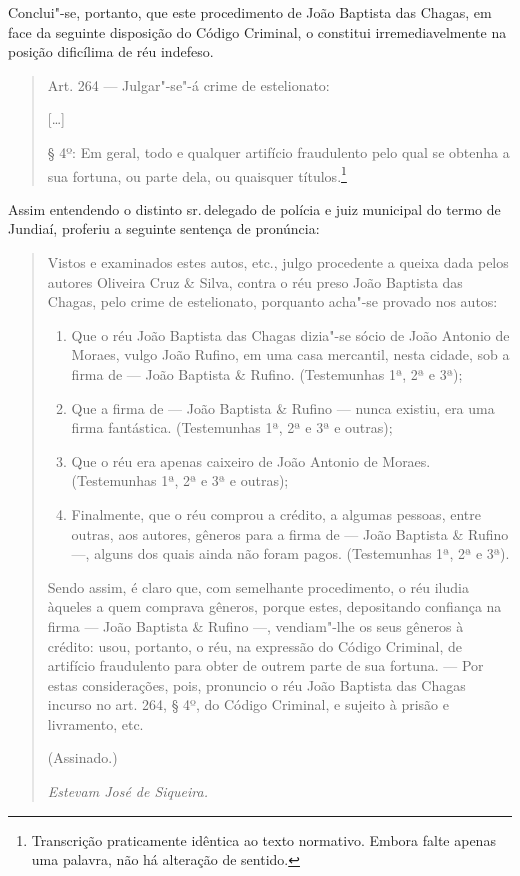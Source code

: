 Conclui"-se, portanto, que este procedimento de João Baptista das Chagas,
em face da seguinte disposição do Código Criminal, o constitui
irremediavelmente na posição dificílima de réu indefeso.

\begin{quote}
Art. 264 --- Julgar"-se"-á crime de estelionato:

{[}\ldots{}{]}

§ 4º: Em geral, todo e qualquer artifício fraudulento pelo qual se
obtenha a sua fortuna, ou parte dela, ou quaisquer títulos.\footnote{Transcrição
  praticamente idêntica ao texto normativo. Embora falte apenas uma
  palavra, não há alteração de sentido.}
\end{quote}

Assim entendendo o distinto sr.\,delegado de polícia e juiz municipal do
termo de Jundiaí, proferiu a seguinte sentença de pronúncia:

\begin{quote}
Vistos e examinados estes autos, etc., julgo procedente a queixa dada
pelos autores Oliveira Cruz \& Silva, contra o réu preso João Baptista
das Chagas, pelo crime de estelionato, porquanto acha"-se provado nos
autos:

\begin{enumerate}[label=\arabic*º]
\item\mbox{} Que o réu João Baptista das Chagas dizia"-se sócio de João Antonio de
Moraes, vulgo João Rufino, em uma casa mercantil, nesta cidade, sob a
firma de --- João Baptista \& Rufino. (Testemunhas 1ª, 2ª e 3ª);

\item\mbox{} Que a firma de --- João Baptista \& Rufino --- nunca existiu, era uma
firma fantástica. (Testemunhas 1ª, 2ª e 3ª e outras);

\item\mbox{} Que o réu era apenas caixeiro de João Antonio de Moraes.
(Testemunhas 1ª, 2ª e 3ª e outras);

\item\mbox{} Finalmente, que o réu comprou a crédito, a algumas pessoas, entre
outras, aos autores, gêneros para a firma de --- João Baptista \&
Rufino ---, alguns dos quais ainda não foram pagos. (Testemunhas 1ª, 2ª
e 3ª).
\end{enumerate}

Sendo assim, é claro que, com semelhante procedimento, o réu iludia
àqueles a quem comprava gêneros, porque estes, depositando confiança na
firma --- João Baptista \& Rufino ---, vendiam"-lhe os seus gêneros à
crédito: usou, portanto, o réu, na expressão do Código Criminal, de
artifício fraudulento para obter de outrem parte de sua fortuna. --- Por
estas considerações, pois, pronuncio o réu João Baptista das Chagas
incurso no art. 264, § 4º, do Código Criminal, e sujeito à prisão e
livramento, etc.

\medskip

\hfill(Assinado.)

\hfill\emph{Estevam José de Siqueira.}
\end{quote}

